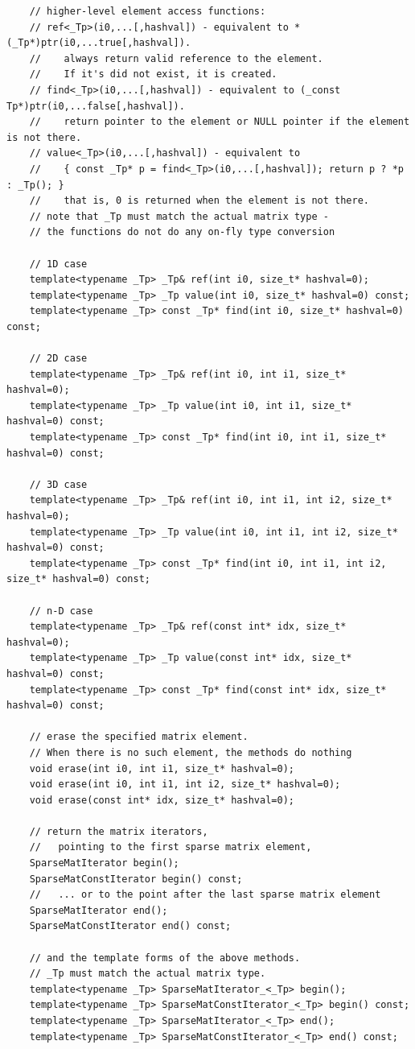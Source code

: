\begin{lstlisting}
    // higher-level element access functions:
    // ref<_Tp>(i0,...[,hashval]) - equivalent to *(_Tp*)ptr(i0,...true[,hashval]).
    //    always return valid reference to the element.
    //    If it's did not exist, it is created.
    // find<_Tp>(i0,...[,hashval]) - equivalent to (_const Tp*)ptr(i0,...false[,hashval]).
    //    return pointer to the element or NULL pointer if the element is not there.
    // value<_Tp>(i0,...[,hashval]) - equivalent to
    //    { const _Tp* p = find<_Tp>(i0,...[,hashval]); return p ? *p : _Tp(); }
    //    that is, 0 is returned when the element is not there.
    // note that _Tp must match the actual matrix type -
    // the functions do not do any on-fly type conversion
    
    // 1D case
    template<typename _Tp> _Tp& ref(int i0, size_t* hashval=0);   
    template<typename _Tp> _Tp value(int i0, size_t* hashval=0) const;
    template<typename _Tp> const _Tp* find(int i0, size_t* hashval=0) const;

    // 2D case
    template<typename _Tp> _Tp& ref(int i0, int i1, size_t* hashval=0);   
    template<typename _Tp> _Tp value(int i0, int i1, size_t* hashval=0) const;
    template<typename _Tp> const _Tp* find(int i0, int i1, size_t* hashval=0) const;
    
    // 3D case
    template<typename _Tp> _Tp& ref(int i0, int i1, int i2, size_t* hashval=0);
    template<typename _Tp> _Tp value(int i0, int i1, int i2, size_t* hashval=0) const;
    template<typename _Tp> const _Tp* find(int i0, int i1, int i2, size_t* hashval=0) const;

    // n-D case
    template<typename _Tp> _Tp& ref(const int* idx, size_t* hashval=0);
    template<typename _Tp> _Tp value(const int* idx, size_t* hashval=0) const;
    template<typename _Tp> const _Tp* find(const int* idx, size_t* hashval=0) const;

    // erase the specified matrix element.
    // When there is no such element, the methods do nothing
    void erase(int i0, int i1, size_t* hashval=0);
    void erase(int i0, int i1, int i2, size_t* hashval=0);
    void erase(const int* idx, size_t* hashval=0);

    // return the matrix iterators,
    //   pointing to the first sparse matrix element,
    SparseMatIterator begin();
    SparseMatConstIterator begin() const;
    //   ... or to the point after the last sparse matrix element
    SparseMatIterator end();
    SparseMatConstIterator end() const;
    
    // and the template forms of the above methods.
    // _Tp must match the actual matrix type.
    template<typename _Tp> SparseMatIterator_<_Tp> begin();
    template<typename _Tp> SparseMatConstIterator_<_Tp> begin() const;
    template<typename _Tp> SparseMatIterator_<_Tp> end();
    template<typename _Tp> SparseMatConstIterator_<_Tp> end() const;


\end{lstlisting}
